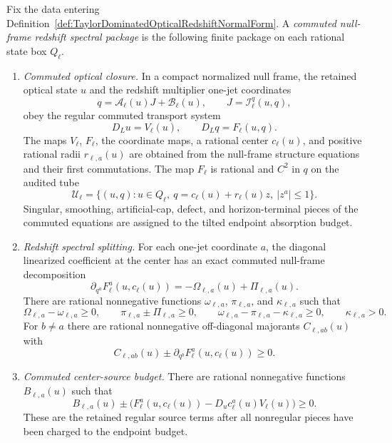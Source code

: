 \begin{definition}\label{def:CommutedNullFrameRedshiftSpectralPackage}
Fix the data entering
Definition~\ref{def:TaylorDominatedOpticalRedshiftNormalForm}.  A
\emph{commuted null-frame redshift spectral package} is the following
finite package on each rational state box $Q_\ell$.
\begin{enumerate}
    \item \emph{Commuted optical closure.}  In a compact normalized null frame,
    the retained optical state $u$ and the redshift multiplier one-jet
    coordinates
    \[
        q=\mathcal A_\ell(u)J+\mathcal B_\ell(u),
        \qquad J=\mathcal I_\ell^q(u,q),
    \]
    obey the regular commuted transport system
    \[
        D_Lu=V_\ell(u),
        \qquad
        D_Lq=F_\ell(u,q).
    \]
    The maps $V_\ell$, $F_\ell$, the coordinate maps, a rational center
    $c_\ell(u)$, and positive rational radii $r_{\ell,a}(u)$ are obtained from
    the null-frame structure equations and their first commutations.  The map
    $F_\ell$ is rational and $C^2$ in $q$ on the audited tube
    \[
        \mathcal U_\ell
        =
        \{(u,q):u\in Q_\ell,\ q=c_\ell(u)+r_\ell(u)z,\ |z^a|\le1\}.
    \]
    Singular, smoothing, artificial-cap, defect, and horizon-terminal pieces
    of the commuted equations are assigned to the tilted endpoint absorption
    budget.

    \item \emph{Redshift spectral splitting.}  For each one-jet coordinate
    $a$, the diagonal linearized coefficient at the center has an exact
    commuted null-frame decomposition
    \[
        \partial_{q^a}F_\ell^a(u,c_\ell(u))
        =
        -\Omega_{\ell,a}(u)+\Pi_{\ell,a}(u).
    \]
    There are rational nonnegative functions
    $\omega_{\ell,a}$, $\pi_{\ell,a}$, and
    $\kappa_{\ell,a}$ such that
    \[
        \Omega_{\ell,a}-\omega_{\ell,a}\ge0,
        \qquad
        \pi_{\ell,a}\pm\Pi_{\ell,a}\ge0,
        \qquad
        \omega_{\ell,a}-\pi_{\ell,a}-\kappa_{\ell,a}\ge0,
        \qquad
        \kappa_{\ell,a}>0 .
    \]
    For $b\ne a$ there are rational nonnegative off-diagonal majorants
    $C_{\ell,ab}(u)$ with
    \[
        C_{\ell,ab}(u)
        \pm
        \partial_{q^b}F_\ell^a(u,c_\ell(u))
        \ge0 .
    \]

    \item \emph{Commuted center-source budget.}  There are rational
    nonnegative functions $B_{\ell,a}(u)$ such that
    \[
        B_{\ell,a}(u)
        \pm
        \bigl(
        F_\ell^a(u,c_\ell(u))-D_uc_\ell^a(u)V_\ell(u)
        \bigr)
        \ge0 .
    \]
    These are the retained regular source terms after all nonregular pieces
    have been charged to the endpoint budget.


\end{enumerate}
\end{definition}
